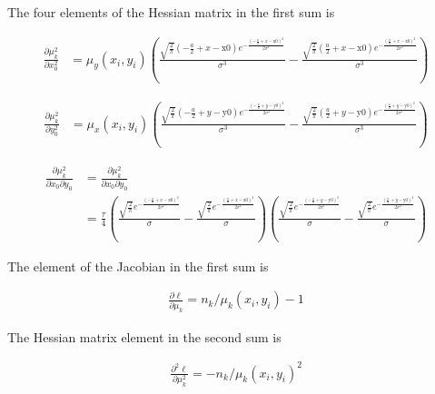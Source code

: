 \documentclass{ucetd}
\begin{document}
The four elements of the Hessian matrix in the first sum is

\begin{align*}
\frac{\partial \mu_{k}^{2}}{\partial x_{0}^{2}} &= \mu_{y}(x_{i},y_{i})\left(\frac{\sqrt{\frac{2}{\pi }} \left(-\frac{a}{2}+x-\text{x0}\right) e^{-\frac{\left(-\frac{a}{2}+x-\text{x0}\right)^2}{2 \sigma ^2}}}{\sigma ^3}-\frac{\sqrt{\frac{2}{\pi }} \left(\frac{a}{2}+x-\text{x0}\right) e^{-\frac{\left(\frac{a}{2}+x-\text{x0}\right)^2}{2 \sigma ^2}}}{\sigma ^3}\right)
\end{align*}

\begin{align*}
\frac{\partial \mu_{k}^{2}}{\partial y_{0}^{2}} &= \mu_{x}(x_{i},y_{i})\left(\frac{\sqrt{\frac{2}{\pi }} \left(-\frac{a}{2}+y-\text{y0}\right) e^{-\frac{\left(-\frac{a}{2}+y-\text{y0}\right)^2}{2 \sigma ^2}}}{\sigma ^3}-\frac{\sqrt{\frac{2}{\pi }} \left(\frac{a}{2}+y-\text{y0}\right) e^{-\frac{\left(\frac{a}{2}+y-\text{y0}\right)^2}{2 \sigma ^2}}}{\sigma ^3}\right)
\end{align*}

\begin{align*}
\frac{\partial \mu_{k}^{2}}{\partial x_{0}\partial y_{0}} &= \frac{\partial \mu_{k}^{2}}{\partial x_{0}\partial y_{0}} \\
&= \frac{\tau}{4}\left(\frac{\sqrt{\frac{2}{\pi }} e^{-\frac{\left(-\frac{a}{2}+x-\text{x0}\right)^2}{2 \sigma ^2}}}{\sigma }-\frac{\sqrt{\frac{2}{\pi }} e^{-\frac{\left(\frac{a}{2}+x-\text{x0}\right)^2}{2 \sigma ^2}}}{\sigma }\right) \left(\frac{\sqrt{\frac{2}{\pi }} e^{-\frac{\left(-\frac{a}{2}+y-\text{y0}\right)^2}{2 \sigma ^2}}}{\sigma }-\frac{\sqrt{\frac{2}{\pi }} e^{-\frac{\left(\frac{a}{2}+y-\text{y0}\right)^2}{2 \sigma ^2}}}{\sigma }\right)
\end{align*}

The element of the Jacobian in the first sum is

\begin{align*}
\frac{\partial\ell}{\partial\mu_{k}} = n_{k}/\mu_{k}(x_{i},y_{i}) - 1
\end{align*}


The Hessian matrix element in the second sum is

\begin{align*}
\frac{\partial^{2}\ell}{\partial\mu_{k}^{2}} = -n_{k}/\mu_{k}(x_{i},y_{i})^{2} 
\end{align*}

\begin{equation*}

\end{equation*}
\end{document}
